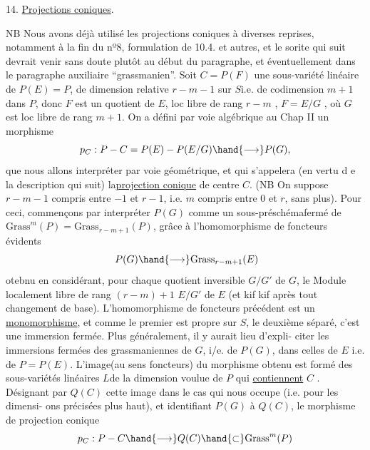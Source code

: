 
14. \uline{Projections coniques}.

NB Nous avons déjà utilisé les projections coniques à diverses
\placedmargin{$\|$}reprises, notamment à la fin du nº8, formulation de 10.4. et autres, et
le sorite qui suit devrait venir sans doute plutôt au début du paragraphe,
et éventuellement dans le paragraphe auxiliaire ``grassmanien''.
Soit $C = P(F)$ une sous-variété linéaire de $P(E)=P$, de dimension
relative $r-m-1$  sur $S$i.e. de codimension $m+1$ dans $P$, donc $F$ est un quotient de $E$, loc libre de
rang $r-m$ , $F=E/G$ , où $G$ est loc libre de rang $m+1$. On a défini
par voie algébrique au Chap II un morphisme
\[ p_C : P - C = P(E) - P(E/G) \hand{\longrightarrow} P(G) , \]
que nous allons interpréter par voie géométrique, et qui s'appelera
(en vertu d e la description qui suit) la\uline{projection conique} de centre $C$.
(NB On suppose $r-m-1$ compris entre $-1$ et $r-1$, i.e. $m$ compris entre $0$
et $r$, sans plus). Pour ceci, commençons par interpréter  $P(G)$
comme un sous-préschémafermé de $\mathrm{Grass}^m(P)= \mathrm{Grass}_{r-m+1}(P)$, grâce à l'homomorphisme
de foncteurs évidents
\[ \ P(G) \hand{\longrightarrow} \mathrm{Grass}_{r-m+1}(E) \]
otebnu en considérant, pour chaque quotient inversible $G/G'$ de $G$, le
Module localement libre de rang $(r-m)+1$ $E/G'$ de $E$ (et kif kif après
tout changement de base). L'homomorphisme de foncteurs précédent est un
\uline{monomorphisme}, et comme le premier est propre sur $S$, le deuxième séparé,
c'est une immersion fermée. Plus généralement, il y aurait lieu d'expli-%
citer les immersions fermées des grassmaniennes de $G$, i/e. de $P(G)$,
dans celles de $E$ i.e. de $P=P(E)$.  L'image(au sens foncteurs) du morphisme obtenu est formé des
sous-variétés linéaires  $L$de la dimension voulue de $P$ qui \uline{contiennent} $C$ . Désignant
par $Q(C)$ cette image dans le cas qui nous occupe (i.e. pour les dimensi-%
ons précisées plus haut), et identifiant $P(G)$ à $Q(C)$, le morphisme
de projection conique
\[ p_C : P - C \hand{\longrightarrow} Q(C) \hand{\subset} \mathrm{Grass}^m(P) \]

